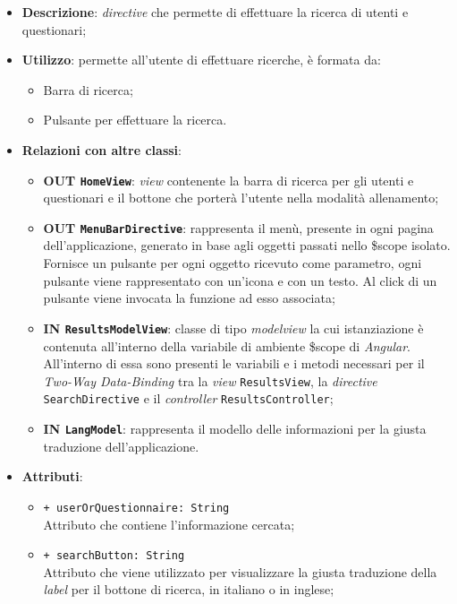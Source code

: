 \begin{itemize}
	\item \textbf{Descrizione}: \textit{directive} che permette di effettuare la ricerca di utenti e questionari;
	\item \textbf{Utilizzo}: permette all'utente di effettuare ricerche, è formata da:
	\begin{itemize}
		\item Barra di ricerca;
		\item Pulsante per effettuare la ricerca.
	\end{itemize}
	\item \textbf{Relazioni con altre classi}:
	\begin{itemize}
		\item \textbf{OUT \texttt{HomeView}}: \textit{view} contenente la barra di ricerca per gli utenti e questionari e il bottone che porterà l'utente nella modalità allenamento;
		\item \textbf{OUT \texttt{MenuBarDirective}}: rappresenta il menù, presente in ogni pagina dell'applicazione, generato in base agli oggetti passati nello \$scope isolato. Fornisce un pulsante per ogni oggetto ricevuto come parametro, ogni pulsante viene rappresentato con un'icona e con un testo. Al click di un pulsante viene invocata la funzione ad esso associata;
		\item \textbf{IN \texttt{ResultsModelView}}: classe di tipo \textit{modelview} la cui istanziazione è contenuta all'interno della variabile di ambiente \$scope di \textit{Angular}. All'interno di essa sono presenti le variabili e i metodi necessari per il \textit{Two-Way Data-Binding} tra la \textit{view} \texttt{ResultsView}, la \textit{directive} \texttt{SearchDirective} e il \textit{controller} \texttt{ResultsController};
		\item \textbf{IN \texttt{LangModel}}: rappresenta il modello delle informazioni per la giusta traduzione dell'applicazione.
	\end{itemize}
	\item \textbf{Attributi}:
	\begin{itemize}
		\item \texttt{+ userOrQuestionnaire: String} \\ Attributo che contiene l'informazione cercata;
		\item \texttt{+ searchButton: String} \\ Attributo che viene utilizzato per visualizzare la giusta traduzione della \textit{label} per il bottone di ricerca, in italiano o in inglese;

\end{itemize}
\end{itemize}
